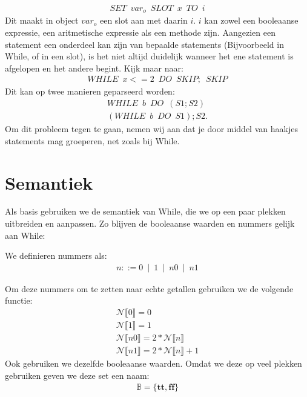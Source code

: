 \documentclass[12pt]{article}
\begin{document}
\begin{align*}
	 SET \enspace var_o\enspace SLOT\enspace x\enspace TO\enspace i
\end{align*} 
Dit maakt in object $var_o$ een slot aan met daarin $i$. $i$ kan zowel een booleaanse expressie, een aritmetische expressie als een methode zijn. 
Aangezien een statement een onderdeel kan zijn van bepaalde statements (Bijvoorbeeld in While, of in een slot), is het niet altijd duidelijk wanneer het ene statement is afgelopen en het andere begint. Kijk maar naar:
\begin{align*}
WHILE \enspace x <= 2 \enspace DO \enspace SKIP; \enspace SKIP
\end{align*}
Dit kan op twee manieren geparseerd worden:
\begin{gather*}
WHILE\enspace b\enspace DO\enspace (S1;S2) \\
(WHILE\enspace b\enspace DO\enspace S1); S2. 
\end{gather*} 
Om dit probleem tegen te gaan, nemen wij aan dat je door middel van haakjes statements mag groeperen, net zoals bij While.
\pagebreak

\section{Semantiek}

Als basis gebruiken we de semantiek van While, die we op een paar plekken uitbreiden en aanpassen.
Zo blijven de booleaanse waarden en nummers gelijk aan While:

We definieren nummers als:
\begin{align*}
n ::= 0 \enspace|\enspace 1 \enspace|\enspace n0 \enspace|\enspace n1
\end{align*}

Om deze nummers om te zetten naar echte getallen gebruiken we de volgende functie:
\begin{gather*} 
\mathcal{N}\llbracket 0 \rrbracket = 0  \\
\mathcal{N}\llbracket 1 \rrbracket = 1 \\
\mathcal{N}\llbracket n0 \rrbracket = 2 * \mathcal{N}\llbracket n \rrbracket \\
\mathcal{N}\llbracket n1 \rrbracket = 2 * \mathcal{N}\llbracket n \rrbracket + 1 
\end{gather*}
Ook gebruiken we dezelfde booleaanse waarden. Omdat we deze op veel plekken gebruiken geven we deze set een naam:
\begin{align*}
\mathds{B} = \{\boldsymbol{tt},\boldsymbol{ff}\}
\end{align*}
\end{document}
